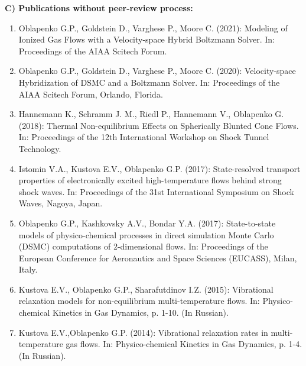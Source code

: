 \documentclass{resume} %
\begin{document}
{\bf C) Publications without peer-review process:}
\begin{enumerate}

    \item {Oblapenko G.P., Goldstein D., Varghese P., Moore C.} (2021): Modeling of Ionized Gas Flows with a Velocity-space Hybrid Boltzmann Solver. In: Proceedings of the AIAA Scitech Forum.
    
    \item {Oblapenko G.P., Goldstein D., Varghese P., Moore C.} (2020): Velocity-space Hybridization of DSMC and a Boltzmann Solver. In: Proceedings of the AIAA Scitech Forum, Orlando, Florida.

    \item {Hannemann K., Schramm J. M., Riedl P., Hannemann V., { Oblapenko G.}} (2018): Thermal Non-equilibrium Effects on Spherically Blunted Cone Flows. In: Proceedings of the 12th International Workshop on Shock Tunnel Technology.
    
    \item Istomin V.A., Kustova E.V., {Oblapenko G.P.} (2017): State-resolved transport properties of electronically excited high-temperature flows behind strong shock waves. In: Proceedings of the 31st International Symposium on Shock Waves, Nagoya, Japan.
    
    \item {{Oblapenko G.P.}, Kashkovsky A.V., Bondar Y.A.} (2017): State-to-state models of physico-chemical processes in direct simulation Monte Carlo (DSMC) computations of 2-dimensional flows. In: Proceedings of the European Conference for Aeronautics and Space Sciences (EUCASS), Milan, Italy.

    \item  {Kustova E.V., {Oblapenko G.P.}, Sharafutdinov I.Z.} (2015):  {Vibrational relaxation models for non-equilibrium multi-temperature flows}. In: Physico-chemical Kinetics in Gas Dynamics, p. 1-10. (In Russian).

    \item  {Kustova E.V.,{Oblapenko G.P.}} (2014): {Vibrational relaxation rates in multi-temperature gas flows.} In: Physico-chemical Kinetics in Gas Dynamics, p. 1-4. (In Russian).
\end{enumerate}
\end{document}
